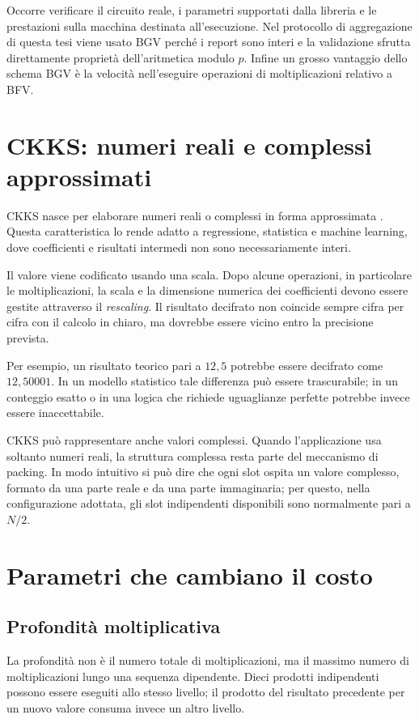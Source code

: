 Occorre verificare il circuito reale, i parametri supportati dalla libreria e le prestazioni sulla macchina destinata all'esecuzione. Nel protocollo di aggregazione di questa tesi viene usato BGV perch\'e i report sono interi e la validazione sfrutta direttamente propriet\`a dell'aritmetica modulo $p$. Infine un grosso vantaggio dello schema BGV è la velocità nell'eseguire operazioni di moltiplicazioni relativo a BFV.

\section{CKKS: numeri reali e complessi approssimati}
CKKS nasce per elaborare numeri reali o complessi in forma approssimata \cite{ckks}. Questa caratteristica lo rende adatto a regressione, statistica e machine learning, dove coefficienti e risultati intermedi non sono necessariamente interi.

Il valore viene codificato usando una scala. Dopo alcune operazioni, in particolare le moltiplicazioni, la scala e la dimensione numerica dei coefficienti devono essere gestite attraverso il \emph{rescaling}. Il risultato decifrato non coincide sempre cifra per cifra con il calcolo in chiaro, ma dovrebbe essere vicino entro la precisione prevista.

Per esempio, un risultato teorico pari a $12{,}5$ potrebbe essere decifrato come $12{,}50001$. In un modello statistico tale differenza pu\`o essere trascurabile; in un conteggio esatto o in una logica che richiede uguaglianze perfette potrebbe invece essere inaccettabile.

CKKS pu\`o rappresentare anche valori complessi. Quando l'applicazione usa soltanto numeri reali, la struttura complessa resta parte del meccanismo di packing. In modo intuitivo si pu\`o dire che ogni slot ospita un valore complesso, formato da una parte reale e da una parte immaginaria; per questo, nella configurazione adottata, gli slot indipendenti disponibili sono normalmente pari a $N/2$.

\section{Parametri che cambiano il costo}
\subsection{Profondit\`a moltiplicativa}
La profondit\`a non \`e il numero totale di moltiplicazioni, ma il massimo numero di moltiplicazioni lungo una sequenza dipendente. Dieci prodotti indipendenti possono essere eseguiti allo stesso livello; il prodotto del risultato precedente per un nuovo valore consuma invece un altro livello.

